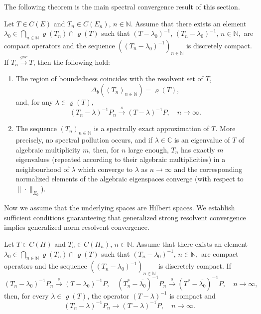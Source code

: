 \documentclass[a4paper,reqno]{amsart}
\begin{document}
{The following theorem is  the main spectral convergence result of this section.
\begin{theorem}\label{mainthmforgsr}
Let $T\in C(E)$ and $T_n\in C(E_n)$, $n\in{\mathbb{N}}$.
Assume that there exists an element
$\lambda_0\in\underset{n\in{\mathbb{N}}}{\bigcap}\varrho(T_n)\cap\varrho(T)$ such that $(T-\lambda_0)^{-1}$, $(T_n-\lambda_0)^{-1},\,n\in{\mathbb{N}},$ are compact operators
and the sequence $\left((T_n-\lambda_0)^{-1}\right)_{n\in{\mathbb{N}}}$ is discretely compact.
If $T_n{\stackrel{gsr}{\rightarrow}} T$, then the following hold:
\begin{enumerate}[label=\rm{\roman{*})}]
\item The region of boundedness coincides with the resolvent set of $T$, $$\Delta_b\left((T_n)_{n\in{\mathbb{N}}}\right)=\varrho(T),$$ 
and, for any $\lambda\in\varrho(T)$, 
\begin{equation}\label{eq.gsr.atalllm}
(T_n-\lambda)^{-1}P_n{\stackrel{s}{\longrightarrow}} (T-\lambda)^{-1}P, \quad n\to\infty.
\end{equation}
\item The sequence $(T_n)_{n\in{\mathbb{N}}}$ is a spectrally exact approximation of $T$.
More precisely, no spectral pollution occurs, and if $\lambda \in {\mathbb{C}}$ is an eigenvalue of $T$ of algebraic multiplicity $m$,
then, for $n$ large enough,  $T_n$ has exactly $m$ eigenvalues {\rm(}repeated according to their algebraic multiplicities{\rm)} in a neighbourhood of $\lambda$ which converge to $\lambda$ as $n\to \infty$ and the corresponding normalized elements of the algebraic eigenspaces converge {\rm(}with respect to $\|\cdot\|_{E_0}${\rm)}.
\end{enumerate}
\end{theorem}

Now we assume that the underlying spaces are Hilbert spaces. 
We establish sufficient conditions guaranteeing that generalized strong resolvent convergence implies generalized norm resolvent convergence.

\begin{theorem}\label{thmgsrimpliesgnrbasic}
Let $T\in C(H)$ and $T_n\in C(H_n)$, $n\in{\mathbb{N}}$.
Assume that there exists an element
$\lambda_0\in\underset{n\in{\mathbb{N}}}{\bigcap}\varrho(T_n)\cap\varrho(T)$ such that  $(T_n-\lambda_0)^{-1},\,n\in{\mathbb{N}},$ are compact operators
and the sequence $\left((T_n-\lambda_0)^{-1}\right)_{n\in{\mathbb{N}}}$ is discretely compact.
If $$(T_n-\lambda_0)^{-1}P_n{\stackrel{s}{\longrightarrow}}(T-\lambda_0)^{-1}P, \quad (T_n^*-\overline{\lambda_0})^{-1}P_n{\stackrel{s}{\longrightarrow}} (T^*-\overline{\lambda_0})^{-1}P,\quad n\to\infty,$$ 
then, for every $\lambda\in\varrho(T)$, the operator $(T-\lambda)^{-1}$ is compact and $$(T_n-\lambda)^{-1}P_n{\longrightarrow} (T-\lambda)^{-1}P, \quad n\to\infty.$$
\end{theorem}

}
\end{document}
